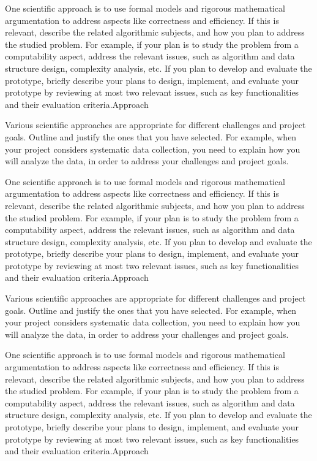 One scientific approach is to use formal models and rigorous mathematical argumentation to address aspects like correctness and efficiency.
If this is relevant, describe the related algorithmic subjects, and how you plan to address the studied problem.
For example, if your plan is to study the problem from a computability aspect, address the relevant issues, such as algorithm and data structure design, complexity analysis, etc.
If you plan to develop and evaluate the prototype, briefly describe your plans to design, implement, and evaluate your prototype by reviewing at most two relevant issues, such as key functionalities and their evaluation criteria.{Approach}

Various scientific approaches are appropriate for different challenges and project goals.
Outline and justify the ones that you have selected.
For example, when your project considers systematic data collection, you need to explain how you will analyze the data, in order to address your challenges and project goals.

One scientific approach is to use formal models and rigorous mathematical argumentation to address aspects like correctness and efficiency.
If this is relevant, describe the related algorithmic subjects, and how you plan to address the studied problem.
For example, if your plan is to study the problem from a computability aspect, address the relevant issues, such as algorithm and data structure design, complexity analysis, etc.
If you plan to develop and evaluate the prototype, briefly describe your plans to design, implement, and evaluate your prototype by reviewing at most two relevant issues, such as key functionalities and their evaluation criteria.{Approach}

Various scientific approaches are appropriate for different challenges and project goals.
Outline and justify the ones that you have selected.
For example, when your project considers systematic data collection, you need to explain how you will analyze the data, in order to address your challenges and project goals.

One scientific approach is to use formal models and rigorous mathematical argumentation to address aspects like correctness and efficiency.
If this is relevant, describe the related algorithmic subjects, and how you plan to address the studied problem.
For example, if your plan is to study the problem from a computability aspect, address the relevant issues, such as algorithm and data structure design, complexity analysis, etc.
If you plan to develop and evaluate the prototype, briefly describe your plans to design, implement, and evaluate your prototype by reviewing at most two relevant issues, such as key functionalities and their evaluation criteria.{Approach}

